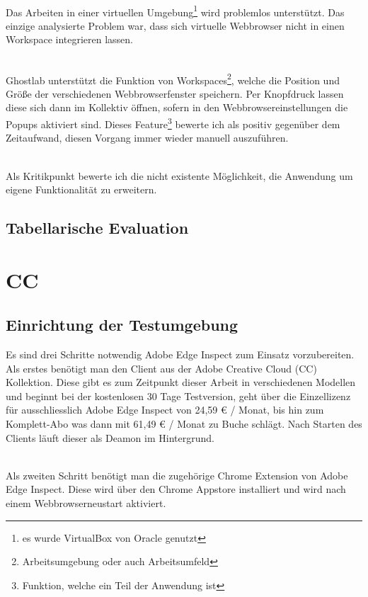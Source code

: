 		\\Das Arbeiten in einer virtuellen Umgebung\footnote{es wurde \Gls{VirtualBox} von Oracle genutzt} wird problemlos unterstützt. Das einzige analysierte Problem war, dass sich virtuelle \Gls{Webbrowser} nicht in einen \Gls{Workspace} integrieren lassen.

		\\Ghostlab unterstützt die Funktion von \Gls{Workspace}s\footnote{Arbeitsumgebung oder auch Arbeitsumfeld}, welche die Position und Größe der verschiedenen \Gls{Webbrowser}fenster speichern. Per Knopfdruck lassen diese sich dann im Kollektiv öffnen, sofern in den \Gls{Webbrowser}einstellungen die Popups aktiviert sind. Dieses Feature\footnote{Funktion, welche ein Teil der Anwendung ist} bewerte ich als positiv gegenüber dem Zeitaufwand, diesen Vorgang immer wieder manuell auszuführen.

		\\Als Kritikpunkt bewerte ich die nicht existente Möglichkeit, die Anwendung um eigene Funktionalität zu erweitern.

		\subsection{Tabellarische Evaluation}
	
	\pagebreak
	\section{ CC }
		\subsection {Einrichtung der Testumgebung}
		Es sind drei Schritte notwendig Adobe Edge Inspect zum Einsatz vorzubereiten. Als erstes benötigt man den Client aus der Adobe Creative \Gls{Cloud} (CC) Kollektion. Diese gibt es zum Zeitpunkt dieser Arbeit in verschiedenen Modellen und beginnt bei der kostenlosen 30 Tage Testversion, geht über die Einzellizenz für ausschliesslich Adobe Edge Inspect von 24,59 € / Monat, bis hin zum Komplett-Abo was dann mit 61,49 € / Monat zu Buche schlägt. Nach Starten des Clients läuft dieser als \Gls{Deamon} im Hintergrund. 
		
		\\Als zweiten Schritt benötigt man die zugehörige Chrome Extension von Adobe Edge Inspect. Diese wird über den Chrome \Gls{App}store installiert und wird nach einem \Gls{Webbrowser}neustart aktiviert.
		
